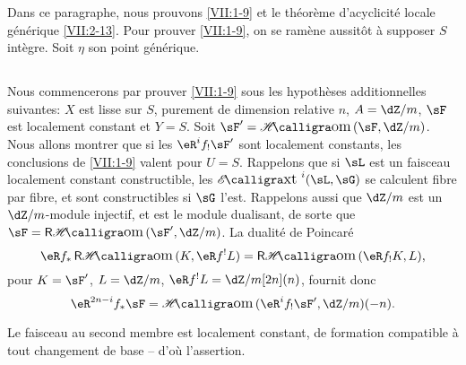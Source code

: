 Dans ce paragraphe, nous prouvons \ref{VII:1-9} et le théorème 
d'acyclicité locale générique \ref{VII:2-13}. Pour prouver \ref{VII:1-9}, 
on se ramène aussitôt à supposer $S$ intègre. Soit $\eta$ son point 
générique. 





\subsection{}\label{VII:2-1}

Nous commencerons par prouver \ref{VII:1-9} sous les hypothèses 
additionnelles suivantes: $X$ est lisse sur $S$, purement de dimension relative 
$n$, $A=\dZ/m$, $\sF$ est localement constant et $Y=S$. Soit 
$\sF'=\Hom(\sF,\dZ/m)$. Nous allons montrer que si les $\eR^i f_! \sF'$ sont 
localement constants, les conclusions de \ref{VII:1-9} valent pour $U=S$. 
Rappelons que si $\sL$ est un faisceau localement constant constructible, les 
$\Ext^i(\sL,\sG)$ se calculent fibre par fibre, et sont constructibles si $\sG$ 
l'est. Rappelons aussi que $\dZ/m$ est un $\dZ/m$-module injectif, et est le 
module dualisant, de sorte que $\sF=\rHom(\sF',\dZ/m)$. La dualité de 
Poincaré 
\[
  \eR f_\ast \rHom(K,\eR f^! L) = \rHom(\eR f_! K,L) \text{,} 
\]
pour $K=\sF'$, $L=\dZ/m$, $\eR f^! L = \dZ/m[2n](n)$, fournit donc 
\[
  \eR^{2n-i} f_\ast \sF = \Hom(\eR^i f_! \sF',\dZ/m)(-n) \text{.} 
\]

Le faisceau au second membre est localement constant, de formation compatible 
à tout changement de base -- d'où l'assertion. 





\subsection{}\label{VII:2-2}


